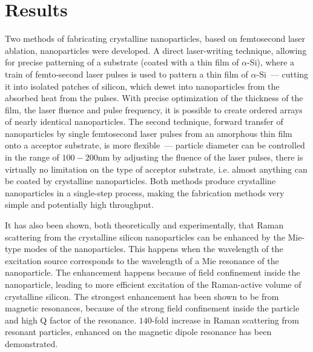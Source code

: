 \section*{Results}
        Two methods of fabricating crystalline nanoparticles, based on femtosecond laser ablation, nanoparticles were developed.
    A direct laser-writing technique, allowing for precise patterning of a substrate (coated with a thin film of $\alpha$-Si),
    where a train of femto-second laser pulses is used to pattern a thin film of $\alpha$-Si~--- cutting it into isolated patches
    of silicon, which dewet into nanoparticles from the absorbed heat from the pulses. With precise optimization of the thickness
    of the film, the laser fluence and pulse frequency, it is possible to create ordered arrays of nearly identical nanoparticles.
    The second technique, forward transfer of nanoparticles by single femtosecond laser pulses from an amorphous thin film onto
    a acceptor substrate, is more flexible~--- particle diameter can be controlled in the range of $100-200$nm by adjusting the
    fluence of the laser pulses, there is virtually no limitation on the type of acceptor substrate, i.e. almost anything can be coated
    by crystalline nanoparticles. Both methods produce crystalline nanoparticles in a single-step process, making the fabrication
    methods very simple and potentially high throughput.

    It has also been shown, both theoretically and experimentally, that Raman scattering from the crystalline silicon nanoparticles
    can be enhanced by the Mie-type modes of the nanoparticles. This happens when the wavelength of the excitation source corresponds
    to the wavelength of a Mie resonance of the nanoparticle. The enhancement happens because of field confinement inside the nanoparticle,
    leading to more efficient excitation of the Raman-active volume of crystalline silicon.
    The strongest enhancement has been shown to be from magnetic resonances, because of the strong field confinement inside the particle
    and high Q factor of the resonance.
    $140$-fold increase in Raman scattering from resonant particles, enhanced on the magnetic dipole resonance has been demonstrated.

